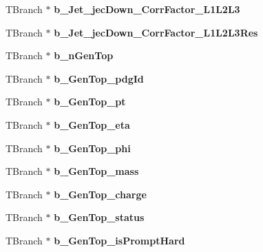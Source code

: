 \begin{DoxyCompactItemize}
\item 
\hypertarget{classMiniTree_a660a88f05e2910c12bb1d97289c73610}{}\label{classMiniTree_a660a88f05e2910c12bb1d97289c73610} 
T\+Branch $\ast$ {\bfseries b\+\_\+\+Jet\+\_\+jec\+Down\+\_\+\+Corr\+Factor\+\_\+\+L1\+L2\+L3}
\item 
\hypertarget{classMiniTree_a41fee3b2cc711c4b27d4e3fcdae9f2fc}{}\label{classMiniTree_a41fee3b2cc711c4b27d4e3fcdae9f2fc} 
T\+Branch $\ast$ {\bfseries b\+\_\+\+Jet\+\_\+jec\+Down\+\_\+\+Corr\+Factor\+\_\+\+L1\+L2\+L3\+Res}
\item 
\hypertarget{classMiniTree_a8ad5fa27097ee857f5c9af0e79f96c95}{}\label{classMiniTree_a8ad5fa27097ee857f5c9af0e79f96c95} 
T\+Branch $\ast$ {\bfseries b\+\_\+n\+Gen\+Top}
\item 
\hypertarget{classMiniTree_ac9944df96675dd872dfb85ce86e7dc68}{}\label{classMiniTree_ac9944df96675dd872dfb85ce86e7dc68} 
T\+Branch $\ast$ {\bfseries b\+\_\+\+Gen\+Top\+\_\+pdg\+Id}
\item 
\hypertarget{classMiniTree_ab0fce0c7ed9f04d9fd923782f660b1d0}{}\label{classMiniTree_ab0fce0c7ed9f04d9fd923782f660b1d0} 
T\+Branch $\ast$ {\bfseries b\+\_\+\+Gen\+Top\+\_\+pt}
\item 
\hypertarget{classMiniTree_a880a475b487ce386861082cc1adcef03}{}\label{classMiniTree_a880a475b487ce386861082cc1adcef03} 
T\+Branch $\ast$ {\bfseries b\+\_\+\+Gen\+Top\+\_\+eta}
\item 
\hypertarget{classMiniTree_ad3fe8885b0aae78e03a9fa0bd619e21b}{}\label{classMiniTree_ad3fe8885b0aae78e03a9fa0bd619e21b} 
T\+Branch $\ast$ {\bfseries b\+\_\+\+Gen\+Top\+\_\+phi}
\item 
\hypertarget{classMiniTree_a10b8b4844b2ff3bca09d300ffff1c833}{}\label{classMiniTree_a10b8b4844b2ff3bca09d300ffff1c833} 
T\+Branch $\ast$ {\bfseries b\+\_\+\+Gen\+Top\+\_\+mass}
\item 
\hypertarget{classMiniTree_a399d254fab6b0195d17539e2854e8d33}{}\label{classMiniTree_a399d254fab6b0195d17539e2854e8d33} 
T\+Branch $\ast$ {\bfseries b\+\_\+\+Gen\+Top\+\_\+charge}
\item 
\hypertarget{classMiniTree_a2ae39598d50f512d919b64c78bfa7d2e}{}\label{classMiniTree_a2ae39598d50f512d919b64c78bfa7d2e} 
T\+Branch $\ast$ {\bfseries b\+\_\+\+Gen\+Top\+\_\+status}
\item 
\hypertarget{classMiniTree_ad810031fc1beb002bb6a1cf8624469d7}{}\label{classMiniTree_ad810031fc1beb002bb6a1cf8624469d7} 
T\+Branch $\ast$ {\bfseries b\+\_\+\+Gen\+Top\+\_\+is\+Prompt\+Hard}
\item 
\hypertarget{classMiniTree_a5ec5b4eb1072bed40c4748da0fbec926}{}\label{classMiniTree_a5ec5b4eb1072bed40c4748da0fbec926} 

\end{DoxyCompactItemize}
